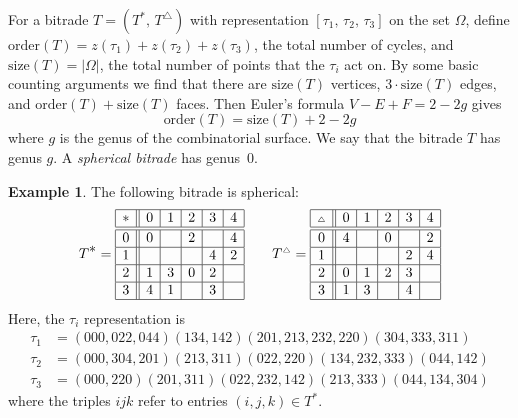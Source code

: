 \documentclass[12pt,amstags,fleqn]{article}
\theoremstyle{plain}
\theoremstyle{definition}
\newtheorem{example}[theorem]{Example}
\newcommand{\darts}{\Omega}
\def\ll{{\textstyle \ast}}
\def\rr{{\scriptscriptstyle \triangle}}
\newcommand{\opa}{\ll}
\newcommand{\opb}{\rr}
\begin{document}
For a bitrade $T = (T^{\opa},\, T^{\opb})$ with representation 
$[\tau_1,\, \tau_2,\, \tau_3]$
on the set $\darts$,
define
$\text{order}(T)  = z(\tau_1) + z(\tau_2) + z(\tau_3)$, the total number
of cycles, and
$\text{size}(T) = \left| \darts \right|$, the total number of points 
that the $\tau_i$ act on. 
By some basic counting arguments we find that there are 
$\text{size}(T)$ vertices, $3 \cdot \text{size}(T)$ edges, and 
$\text{order}(T) + \text{size}(T)$ faces. Then Euler's formula
$V-E+F=2-2g$ gives
\begin{equation}\label{eqnDrapalGenus}
\text{order}(T) = \text{size}(T) + 2 - 2g
\end{equation}
where $g$ is the genus of the combinatorial surface. We say that
the bitrade $T$ has genus $g$.
A {\em spherical bitrade} has genus~$0$.

\begin{example}\label{exspherical}
The following bitrade is spherical:
\begin{align*}
T^{\opa} = 
\begin{array}{|c||c|c|c|c|c|}
\hline
\opa & 0 & 1 & 2 & 3 & 4\\
\hline
 \hline 0 & 0 & ~ & 2 & ~ & 4\\
 \hline 1 & ~ & ~ & ~ & 4 & 2\\
 \hline 2 & 1 & 3 & 0 & 2 & ~\\
 \hline 3 & 4 & 1 & ~ & 3 & ~\\
\hline
\end{array}
& \quad & 
T^{\opb} = 
\begin{array}{|c||c|c|c|c|c|}
\hline
\opb & 0 & 1 & 2 & 3 & 4\\
\hline
 \hline 0 & 4 & ~ & 0 & ~ & 2\\
 \hline 1 & ~ & ~ & ~ & 2 & 4\\
 \hline 2 & 0 & 1 & 2 & 3 & ~\\
 \hline 3 & 1 & 3 & ~ & 4 & ~\\ 
\hline
\end{array}
\end{align*}
Here, the $\tau_i$ representation is
\begin{align*}
\tau_1 &= (000, 022, 044)(134, 142) (201,213,232,220) (304,333,311) \\
\tau_2 &= (000,304,201)(213,311)(022,220)(134,232,333)(044,142) \\
\tau_3 &= (000,220)(201,311)(022,232,142)(213,333)(044,134,304)
\end{align*}
where the triples $ijk$ refer to entries $(i,j,k) \in T^{\opa}$.
\end{example}
\end{document}
